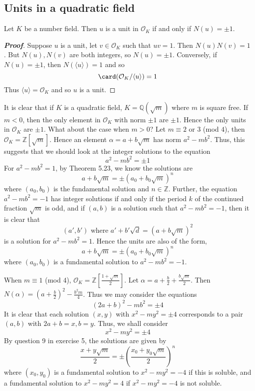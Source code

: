 \subsection{Units in a quadratic field}
\begin{lemma} Let $K$ be a number field. Then $u$ is a unit in $\mathcal{O}_K$ if and only if $N(u)=\pm 1$.
\end{lemma}
\begin{proof}[\bf Proof] Suppose $u$ is a unit, let $v \in \mathcal{O}_K$ such that $uv=1$.
Then $N(u)N(v)=1$. But $N(u),N(v)$ are both integers, so $N(u)=\pm 1$.
Conversely, if $N(u)=\pm 1$, then $N(\langle u \rangle)=1$ and so
$$\card(\mathcal{O}_K/\langle u \rangle)=1$$
Thus $\langle u \rangle=\mathcal{O}_K$ and so $u$ is a unit.
\end{proof}
It is clear that if $K$ is a quadratic field, $K=\mathbb{Q}(\sqrt{m})$ where $m$ is square free.
If $m<0$, then the only element in $\mathcal{O}_K$ with norm $\pm 1$ are $\pm 1$. Hence
the only units in $\mathcal{O}_K$ are $\pm 1$. What about the case when $m>0$?
Let $m \equiv 2$ or $3$ (mod $4$), then $\mathcal{O}_K=\mathbb{Z}[\sqrt{m}]$. Hence an element
$\alpha=a+b\sqrt{m}$ has norm $a^2-mb^2$. Thus, this suggests that we should look at the integer solutions
to the equation
$$a^2-mb^2=\pm 1$$
For $a^2-mb^2=1$, by Theorem 5.23, we know the solutions are
$$a+b\sqrt{m}=\pm(a_0+b_0\sqrt{m})^n$$
where $(a_0,b_0)$ is the fundamental solution and $n \in \mathbb{Z}$.
Further, the equation
$a^2-mb^2=-1$ has integer solutions if and only if the period $k$ of the continued fraction $\sqrt{m}$ is odd,
and if $(a,b)$ is a solution such that $a^2-mb^2=-1$, then it is clear that
$$(a',b') \text{ where } a'+b'\sqrt{d}=(a+b\sqrt{m})^2$$
is a solution for $a^2-mb^2=1$. Hence the units are also of the form,
$$a+b\sqrt{m}=\pm(a_0+b_0\sqrt{m})^n$$
where $(a_0,b_0)$ is a fundamental solution to $a^2-mb^2=-1$.

When $m \equiv 1$ (mod $4$), $\mathcal{O}_K=\mathbb{Z}[\frac{1+\sqrt{m}}{2}]$.
Let $\alpha=a+\frac{b}{2}+\frac{b\sqrt{m}}{2}$. Then $N(\alpha)=(a+\frac{b}{2})^2-\frac{b^2m}{4}$.
Thus we may consider the equations
$$(2a+b)^2-mb^2=\pm 4$$
It is clear that each solution $(x,y)$ with $x^2-my^2=\pm 4$ corresponds to a pair $(a,b)$ with
$2a+b=x,b=y$.
Thus, we shall consider
$$x^2-my^2=\pm 4$$
By question 9 in exercise 5, the solutions are given by
$$\frac{x+y\sqrt{m}}{2}=\pm\left(\frac{x_0+y_0\sqrt{m}}{2}\right)^n$$
where $(x_0,y_0)$ is a fundamental solution to $x^2-my^2=-4$ if this is soluble, and
a fundamental solution to $x^2-my^2=4$ if $x^2-my^2=-4$ is not soluble.

